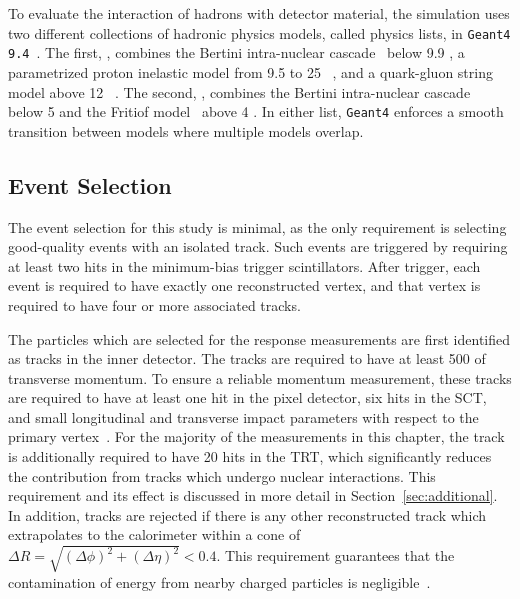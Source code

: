 To evaluate the interaction of hadrons with detector material, the simulation uses two different collections of hadronic physics models, called physics lists, in \texttt{Geant4 9.4}~\cite{G4hadronics}.
The first, \QGSP, combines the Bertini intra-nuclear cascade~\cite{BERT21,BERT22,BERT23} below 9.9 \GeV, a parametrized proton inelastic model from 9.5 to 25 \GeV~\cite{GHEISHA20}, and a quark-gluon string model above 12 \GeV~\cite{QGS15,QGS16,QGS17,QGS18,QGS19}. 
The second, \FTFP, combines the Bertini intra-nuclear cascade~\cite{BERT21,BERT22,BERT23} below 5 \GeV and the Fritiof model~\cite{FTF24,FTF25,FTF26,FTF27} above 4 \GeV.
In either list, \texttt{Geant4} enforces a smooth transition between models where multiple models overlap.

\subsection{Event Selection}
\label{sec:inclusive_selection}
The event selection for this study is minimal, as the only requirement is selecting good-quality events with an isolated track. 
Such events are triggered by requiring at least two hits in the minimum-bias trigger scintillators. 
After trigger, each event is required to have exactly one reconstructed vertex, and that vertex is required to have four or more associated tracks.

The particles which are selected for the response measurements are first identified as tracks in the inner detector.
The tracks are required to have at least 500 \MeV of transverse momentum.
To ensure a reliable momentum measurement, these tracks are required to have at least one hit in the pixel detector, six hits in the SCT, and small longitudinal and transverse impact parameters with respect to the primary vertex~\cite{PERF-2011-05}.
For the majority of the measurements in this chapter, the track is additionally required to have 20 hits in the TRT, which significantly reduces the contribution from tracks which undergo nuclear interactions.
This requirement and its effect is discussed in more detail in Section~\ref{sec:additional}. 
In addition, tracks are rejected if there is any other reconstructed track which extrapolates to the calorimeter within a cone of $\Delta R = \sqrt{(\Delta\phi)^2 + (\Delta\eta)^2} < 0.4$.
This requirement guarantees that the contamination of energy from nearby charged particles is negligible~\cite{PERF-2011-05}.


